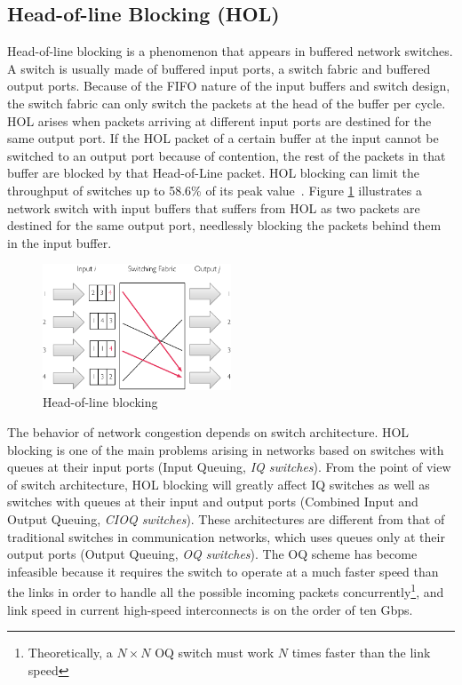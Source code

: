 \documentclass[12pt]{article}
\begin{document}
\subsection{Head-of-line Blocking (HOL)}\label{S:hol_blocking} Head-of-line blocking is a phenomenon that appears in buffered network switches. A switch is usually made of buffered input ports, a switch fabric and buffered output ports. Because of the FIFO nature of the input buffers and switch design, the switch fabric can only switch the packets at the head of the buffer per cycle. HOL arises when packets arriving at different input ports are destined for the same output port. If the HOL packet of a certain buffer at the input cannot be switched to an output port because of contention, the rest of the packets in that buffer are blocked by that Head-of-Line packet. HOL blocking can limit the throughput of switches up to 58.6\% of its peak value~\cite{hol_thoughput}. Figure \ref{fig:hol} illustrates a network switch with input buffers that suffers from HOL as two packets are destined for the same output port, needlessly blocking the packets behind them in the input buffer.

\begin{figure}[ht]
	\centering
		\includegraphics[width=0.50\textwidth]{figures/hol_blocking.pdf}
		\caption{Head-of-line blocking}
		\label{fig:hol}
\end{figure}

The behavior of network congestion depends on switch architecture. HOL blocking is one of the main problems arising in networks based on switches with queues at their input ports (Input Queuing, \emph{IQ switches}). From the point of view of switch architecture, HOL blocking will greatly affect IQ switches as well as switches with queues at their input and output ports (Combined Input and Output Queuing, \emph{CIOQ switches}). These architectures are different from that of traditional switches in communication networks, which uses queues only at their output ports (Output Queuing, \emph{OQ switches}). The OQ scheme has become infeasible because it requires the switch to operate at a much faster speed than the links in order to handle all the possible incoming packets concurrently\footnote{Theoretically, a ${N \times N}$ OQ switch must work ${N}$ times faster than the link speed}, and link speed in current high-speed interconnects is on the order of ten Gbps. 
\end{document}

